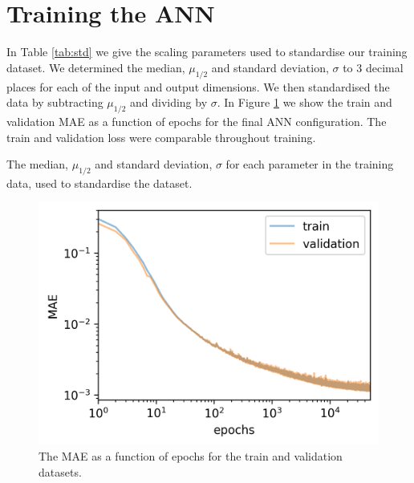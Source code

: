 \documentclass[a4paper,fleqn,usenatbib]{mnras}
\begin{document}


\appendix

\section{Training the ANN}\label{sec:apx-train}


In Table \ref{tab:std} we give the scaling parameters used to standardise our training dataset. We determined the median, $\mu_{1/2}$ and standard deviation, $\sigma$ to 3 decimal places for each of the input and output dimensions. We then standardised the data by subtracting $\mu_{1/2}$ and dividing by $\sigma$. In Figure \ref{fig:loss} we show the train and validation MAE as a function of epochs for the final ANN configuration. The train and validation loss were comparable throughout training.

\begin{table}
    \caption{The median, $\mu_{1/2}$ and standard deviation, $\sigma$ for each parameter in the training data, used to standardise the dataset.}
    \label{tab:std}
    
\end{table}

\begin{figure}
    \centering
    \includegraphics[width=\linewidth]{figures/loss.png}
    \caption{The MAE as a function of epochs for the train and validation datasets.}
    \label{fig:loss}
\end{figure}
\end{document}

